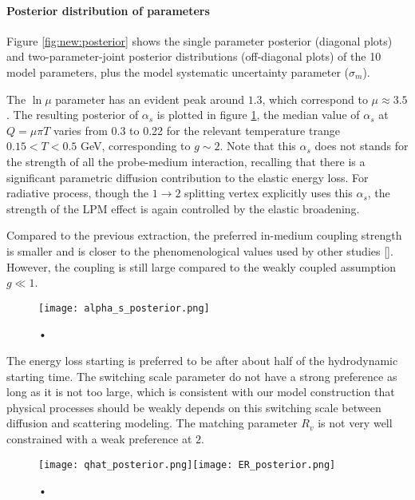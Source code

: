 \paragraph{Posterior distribution of parameters} Figure \ref{fig:new:posterior} shows the single parameter posterior (diagonal plots) and two-parameter-joint posterior distributions (off-diagonal plots) of the 10 model parameters, plus the model systematic uncertainty parameter ($\sigma_m$).

The $\ln\mu$ parameter has an evident peak around $1.3$, which correspond to $\mu \approx 3.5$.
The resulting posterior of $\alpha_s$ is plotted in figure \ref{fig:new:posterior-alphas}, the median value of $\alpha_s$ at $Q=\mu\pi T$ varies from 0.3 to 0.22 for the relevant temperature trange $0.15 < T < 0.5$ GeV, corresponding to $g\sim 2$.
Note that this $\alpha_s$ does not stands for the strength of all the probe-medium interaction, recalling that there is a significant parametric diffusion contribution to the elastic energy loss.
For radiative process, though the $1\rightarrow 2$ splitting vertex explicitly uses this $\alpha_s$, the strength of the LPM effect is again controlled by the elastic broadening.

Compared to the previous extraction, the preferred in-medium coupling strength is smaller and is closer to the phenomenological values used by other studies [].
However, the coupling is still large compared to the weakly coupled assumption $g\ll 1$.

\begin{figure}
\centering
\texttt{[image: alpha\_s\_posterior.png]}
\caption{•}
\label{fig:new:posterior-alphas}
\end{figure}

The energy loss starting is preferred to be after about half of the hydrodynamic starting time.
The switching scale parameter do not have a strong preference as long as it is not too large, which is consistent with our model construction that physical processes should be weakly depends on this switching scale between diffusion and scattering modeling.
The matching parameter $R_v$ is not very well constrained with a weak preference at $2$.


\begin{figure}
\centering
\texttt{[image: qhat\_posterior.png]}\texttt{[image: ER\_posterior.png]}
\caption{•}
\label{fig:new:posterior-qhat}
\end{figure}

